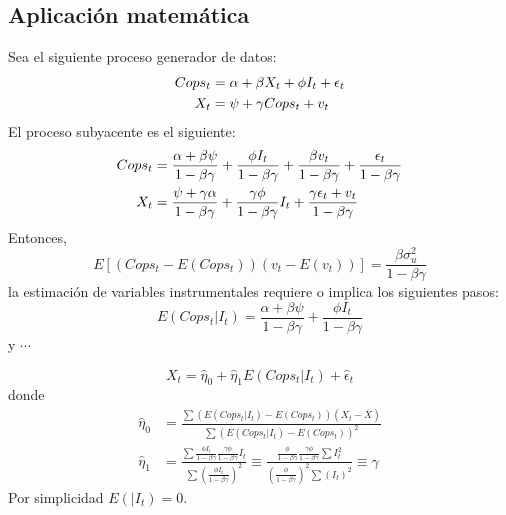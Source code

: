 \subsection{Aplicación matemática}
\begin{frame}
	Sea el siguiente proceso generador de datos:
		\begin{align}
			Cops_{t} & = \alpha + \beta X_{t} + \phi I_{t} + \epsilon_{t} \notag\\
			X_{t} & = \psi + \gamma Cops_{t} + v_t
		\end{align}
	El proceso subyacente es el siguiente:
		\begin{align}
			Cops_{t} & = \frac{\alpha + \beta \psi}{1 -\beta \gamma} + \frac{\phi I_{t}}{1 -\beta \gamma} + \frac{\beta v_{t}}{1 -\beta \gamma} + \frac{\epsilon_{t}}{1 -\beta \gamma} \\
			X_{t} & = \frac{\psi + \gamma \alpha}{1 -\beta \gamma} + \frac{\gamma \phi}{1 -\beta \gamma}I_{t} + \frac{\gamma\epsilon_{t} + v_{t}}{1 -\beta \gamma} \notag
		\end{align}
	Entonces,
		$$E[(Cops_{t} - E(Cops_{t}))(v_t - E(v_t))]=\frac{\beta\sigma_{u}^{2}}{1 -\beta \gamma}$$
	la estimación de variables instrumentales requiere o implica los siguientes pasos:
		$$E(Cops_{t} | I_{t}) = \frac{\alpha + \beta \psi}{1 -\beta \gamma} + \frac{\phi I_{t}}{1 -\beta \gamma}$$
	y $\cdots$

\end{frame}

\begin{frame}
		$$X_{t} = \widehat{\eta}_{0} + \widehat{\eta}_{1}E(Cops_{t}|I_{t}) + \widehat{\epsilon}_{t}$$
	donde
		\begin{align*}
			\widehat{\eta}_{0} & = \frac{\sum (E(Cops_{t}|I_{t})-E(Cops_{t}))(X_{t} - \overline{X})}{\sum (E(Cops_{t}|I_{t}) - E(Cops_{t}))^2}\\
			\widehat{\eta}_{1} & = \frac{\sum \frac{\phi I_{t}}{1 -\beta \gamma} \frac{\gamma \phi}{1 -\beta \gamma}I_{t}}{\sum \left( \frac{\phi I_{t}}{1 -\beta \gamma} \right)^2 } \equiv \frac{\frac{\phi}{1 -\beta \gamma} \frac{\gamma \phi}{1 -\beta \gamma} \sum I_{t}^{2}}{\left(\frac{\phi}{1 -\beta \gamma} \right)^2 \sum (I_{t})^2 } \equiv \gamma
		\end{align*}
	Por simplicidad $E(|I_{t}) = 0$.
\end{frame}